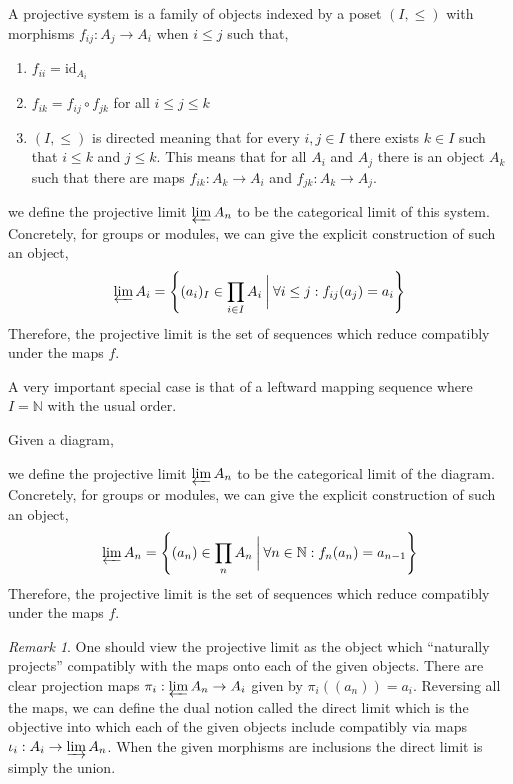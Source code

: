 \documentclass[12pt]{article}
\newcommand{\N}{\mathbb{N}}
\newcommand{\id}{\mathrm{id}}
\theoremstyle{remark}
\newtheorem*{remark}{Remark}
\theoremstyle{definition}
\newenvironment{definition}[1][Definition:]{\begin{trivlist}
\item[\hskip \labelsep {\bfseries #1}]}{\end{trivlist}}
\begin{document}
\begin{definition}
A projective system is a family of objects indexed by a poset $(I, \le)$ with morphisms $f_{ij} : A_j \to A_i$ when $i \le j$ such that,
\begin{enumerate}
\item $f_{ii} = \id_{A_i}$
\item $f_{ik} = f_{ij} \circ f_{jk}$ for all $i \le j \le k$
\item $(I, \le)$ is directed meaning that for every $i, j \in I$ there exists $k \in I$ such that $i \le k$ and $j \le k$. This means that for all $A_i$ and $A_j$ there is an object $A_k$ such that there are maps $f_{ik} : A_k \to A_i$ and $f_{jk} : A_k \to A_j$.
\end{enumerate}
we define the projective limit $\varprojlim A_n$ to be the categorical limit of this system. Concretely, for groups or modules, we can give the explicit construction of such an object,
\[ \varprojlim A_i = \left\{ (a_i)_{I} \in \prod_{i \in I} A_i \: \bigg| \: \forall i \le j : f_{ij}(a_j) = a_{i}  \right\} \]
Therefore, the projective limit is the set of sequences which reduce compatibly under the maps $f$.  
\end{definition}

\noindent
A very important special case is that of a leftward mapping sequence where $I = \N$ with the usual order. 

\begin{definition}
Given a diagram,
\begin{center}
\end{center}
we define the projective limit $\varprojlim A_n$ to be the categorical limit of the diagram. Concretely, for groups or modules, we can give the explicit construction of such an object,
\[ \varprojlim A_n = \left\{ (a_n) \in \prod_n A_n \: \bigg| \: \forall n \in \N : f_n(a_n) = a_{n-1}  \right\} \]
Therefore, the projective limit is the set of sequences which reduce compatibly under the maps $f$.  
\end{definition}

\begin{remark}
One should view the projective limit as the object which ``naturally projects'' compatibly with the maps onto each of the given objects. There are clear projection maps $\pi_i : \varprojlim A_n \to A_i$ given by $\pi_i((a_n)) = a_i$. Reversing all the maps, we can define the dual notion called the direct limit which is the objective into which each of the given objects include compatibly via maps $\iota_i : A_i \to \varinjlim A_n$. When the given morphisms are inclusions the direct limit is simply the union. 
\end{remark}
\end{document}
